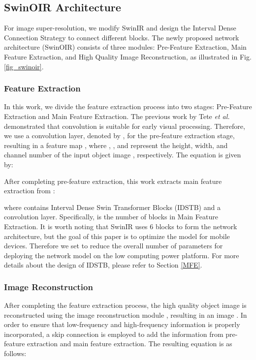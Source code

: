 \documentclass[default,iicol]{sn-jnl}
\theoremstyle{thmstyleone}\newtheorem{theorem}{Theorem}\newtheorem{proposition}[theorem]{Proposition}
\theoremstyle{thmstyletwo}\newtheorem{example}{Example}\newtheorem{remark}{Remark}\theoremstyle{thmstylethree}\newtheorem{definition}{Definition}
\begin{document}
\subsection{SwinOIR Architecture}
For image super-resolution, we modify SwinIR \cite{liang2021swinir} and design the Interval Dense Connection Strategy to connect different blocks. The newly proposed network architecture (SwinOIR) consists of three modules: Pre-Feature Extraction, Main Feature Extraction, and High Quality Image Reconstruction, as illustrated in Fig. \ref{fig_swinoir}.

\subsubsection{Feature Extraction}
In this work, we divide the feature extraction process into two stages: Pre-Feature Extraction and Main Feature Extraction. The previous work by Tete \emph{et al.} \cite{xiao2021early} demonstrated that convolution is suitable for early visual processing. Therefore, we use a  convolution layer, denoted by , for the pre-feature extraction stage, resulting in a feature map , where , , and  represent the height, width, and channel number of the input object image , respectively. The equation is given by:

 

After completing pre-feature extraction, this work extracts main feature  extraction from :

 
where  contains  Interval Dense Swin Transformer Blocks (IDSTB) and a  convolution layer. Specifically,  is the number of blocks in Main Feature Extraction. It is worth noting that SwinIR \cite{liang2021swinir} uses 6 blocks to form the network architecture, but the goal of this paper is to optimize the model for mobile devices. Therefore we set  to reduce the overall number of parameters for deploying the network model on the low computing power platform. For more details about the design of IDSTB, please refer to Section \ref{MFE}.

\subsubsection{Image Reconstruction}
After completing the feature extraction process, the high quality object image is reconstructed using the image reconstruction module , resulting in an image . In order to ensure that low-frequency and high-frequency information is properly incorporated, a skip connection is employed to add the information from pre-feature extraction and main feature extraction. The resulting equation is as follows:
\end{document}
